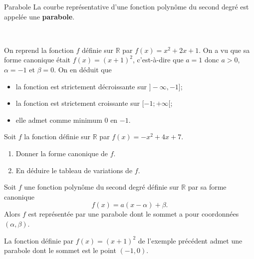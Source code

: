 \documentclass[11pt]{article}
\begin{document}
\begin{defi}{Parabole}
  La courbe représentative d'une fonction polynôme du second degré est appelée
  une \textbf{parabole}.
\end{defi}

\begin{exemple}~\\[-4mm]
  \begin{minipage}[]{.65\textwidth}
  On reprend la fonction $f$ définie sur $\mathbb{R}$ par $f(x) = x^2+2x+1$.
  On a vu que sa forme canonique était $f(x) = (x+1)^2$, c'est-à-dire que $a=1$
  donc $a>0$, $\alpha=-1$ et $\beta=0$. On en déduit que
\begin{itemize}
\item la fonction est strictement décroissante sur $]-\infty, -1]$;
\item la fonction est strictement croissante sur $[-1; +\infty[$;
\item elle admet comme minimum $0$ en $-1$.
\end{itemize}
\end{minipage}
\begin{minipage}[]{.35\textwidth}
 \begin{center}
\end{center}
  \end{minipage}
\end{exemple}

\begin{app}
  Soit $f$ la fonction définie sur $\mathbb{R}$ par $f(x)=-x^2+4x+7$.
  \begin{enumerate}
    \item Donner la forme canonique de $f$.
    \item En déduire le tableau de variations de $f$.
  \end{enumerate}
\end{app}

\begin{prop}
  Soit $f$ une fonction polynôme du second degré définie sur $\mathbb{R}$ par sa
  forme canonique
  \[
    f(x) = a(x-\alpha)+\beta.
  \]
  Alors $f$ est représentée par une parabole dont le sommet a pour coordonnées
  $(\alpha, \beta)$.
\end{prop}
\begin{exemple}
  La fonction définie par $f(x)=(x+1)^2$ de l'exemple précédent admet une
  parabole dont le sommet est le point $(-1, 0)$.
\end{exemple}
\end{document}
